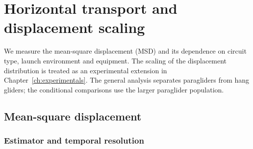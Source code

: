 \chapter{Horizontal transport and displacement scaling}
\label{ch:fixed-transport}








We measure the mean-square displacement (MSD) and its dependence on circuit type,
launch environment and equipment. The scaling of the displacement distribution is
treated as an experimental extension in Chapter~\ref{ch:experimentals}.
The general analysis separates paragliders from hang gliders; the conditional
comparisons use the larger paraglider population.

\section{Mean-square displacement}
\label{sec:fixed-msd}
\subsection{Estimator and temporal resolution}

